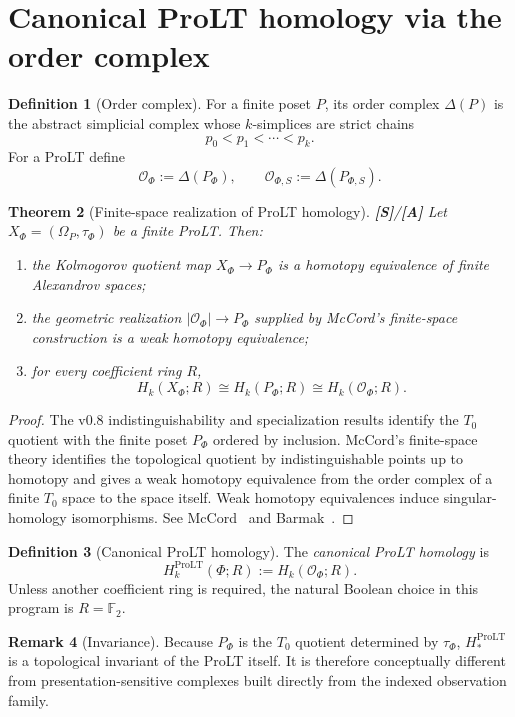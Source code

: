 \documentclass[11pt]{article}
\newtheorem{theorem}{Theorem}[section]
\theoremstyle{definition}
\newtheorem{definition}[theorem]{Definition}
\newtheorem{remark}[theorem]{Remark}
\newcommand{\F}{\mathbb F_2}
\newcommand{\Om}{\Omega_P}
\newcommand{\OX}{\mathcal O}
\newcommand{\statusS}{\textbf{[S]}}
\newcommand{\statusA}{\textbf{[A]}}
\begin{document}
\section{Canonical ProLT homology via the order complex}

\begin{definition}[Order complex]
For a finite poset $P$, its order complex $\Delta(P)$ is the abstract simplicial complex whose $k$-simplices are strict chains
\[
p_0<p_1<\cdots<p_k.
\]
For a ProLT define
\[
\OX_\Phi:=\Delta(P_\Phi),\qquad
\OX_{\Phi,S}:=\Delta(P_{\Phi,S}).
\]
\end{definition}

\begin{theorem}[Finite-space realization of ProLT homology]\label{thm:canonical}
\statusS/\statusA\;
Let $X_\Phi=(\Om,\tau_\Phi)$ be a finite ProLT. Then:
\begin{enumerate}[label=(\roman*)]
\item the Kolmogorov quotient map $X_\Phi\to P_\Phi$ is a homotopy equivalence of finite Alexandrov spaces;
\item the geometric realization $|\OX_\Phi|\to P_\Phi$ supplied by McCord's finite-space construction is a weak homotopy equivalence;
\item for every coefficient ring $R$,
\[
H_k(X_\Phi;R)\cong H_k(P_\Phi;R)\cong H_k(\OX_\Phi;R).
\]
\end{enumerate}
\end{theorem}

\begin{proof}
The v0.8 indistinguishability and specialization results identify the $T_0$ quotient with the finite poset $P_\Phi$ ordered by inclusion. McCord's finite-space theory identifies the topological quotient by indistinguishable points up to homotopy and gives a weak homotopy equivalence from the order complex of a finite $T_0$ space to the space itself. Weak homotopy equivalences induce singular-homology isomorphisms. See McCord~\cite{McCord1966} and Barmak~\cite{Barmak2011}.
\end{proof}

\begin{definition}[Canonical ProLT homology]
The \emph{canonical ProLT homology} is
\[
H_k^{\mathrm{ProLT}}(\Phi;R):=H_k(\OX_\Phi;R).
\]
Unless another coefficient ring is required, the natural Boolean choice in this program is $R=\F$.
\end{definition}

\begin{remark}[Invariance]
Because $P_\Phi$ is the $T_0$ quotient determined by $\tau_\Phi$, $H_*^{\mathrm{ProLT}}$ is a topological invariant of the ProLT itself. It is therefore conceptually different from presentation-sensitive complexes built directly from the indexed observation family.
\end{remark}
\end{document}
